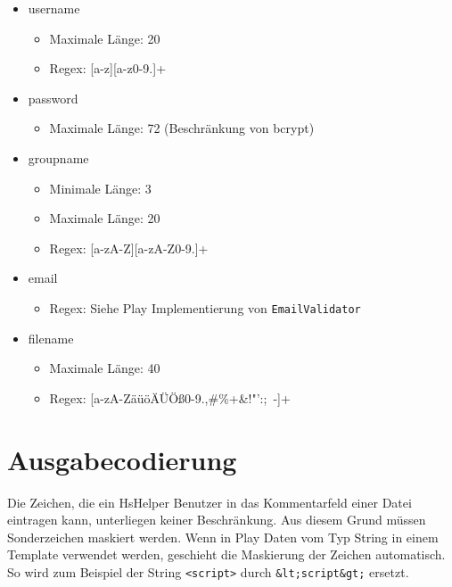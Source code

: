 \documentclass[12pt,DIV14,BCOR10mm,a4paper,parskip=half-,headsepline,headinclude,english,ngerman,bibliography=totocnumbered]{scrreprt}
\begin{document}
\begin{itemize}
	\item username
	 \begin{itemize}
			\item Maximale Länge: 20
			\item Regex: [a-z][a-z0-9.]+
		\end{itemize}


	\item password
	\begin{itemize}
		\item Maximale Länge: 72 (Beschränkung von bcrypt)
	\end{itemize}

	\item groupname
	\begin{itemize}
		\item Minimale Länge: 3
		\item Maximale Länge: 20
		\item Regex: [a-zA-Z][a-zA-Z0-9.]+
	\end{itemize}


	\item email
	\begin{itemize}
		\item Regex: Siehe Play Implementierung von \texttt{EmailValidator}
	\end{itemize}

	\item filename
	\begin{itemize}
		\item Maximale Länge: 40
		\item Regex: [a-zA-ZäüöÄÜÖß0-9.,\#\%+\&!"':;~-]+
	\end{itemize}

\end{itemize}

\section{Ausgabecodierung}
Die Zeichen, die ein HsHelper Benutzer in das Kommentarfeld einer Datei eintragen kann, unterliegen keiner Beschränkung.
Aus diesem Grund müssen Sonderzeichen maskiert werden. Wenn in Play Daten vom Typ String in einem Template verwendet werden, geschieht die Maskierung der Zeichen automatisch. So wird zum Beispiel der String \texttt{<script>} durch \texttt{\&lt;script\&gt;} ersetzt.

\end{document}
